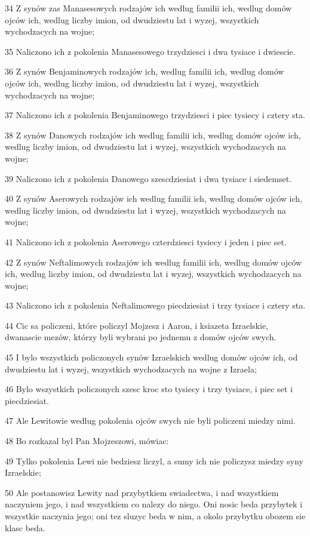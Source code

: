 \par 34 Z synów zas Manasesowych rodzajów ich wedlug familii ich, wedlug domów ojców ich, wedlug liczby imion, od dwudziestu lat i wyzej, wszystkich wychodzacych na wojne;
\par 35 Naliczono ich z pokolenia Manasesowego trzydziesci i dwa tysiace i dwiescie.
\par 36 Z synów Benjaminowych rodzajów ich, wedlug familii ich, wedlug domów ojców ich, wedlug liczby imion, od dwudziestu lat i wyzej, wszystkich wychodzacych na wojne;
\par 37 Naliczono ich z pokolenia Benjaminowego trzydziesci i piec tysiecy i cztery sta.
\par 38 Z synów Danowych rodzajów ich wedlug familii ich, wedlug domów ojców ich, wedlug liczby imion, od dwudziestu lat i wyzej, wszystkich wychodzacych na wojne;
\par 39 Naliczono ich z pokolenia Danowego szescdziesiat i dwa tysiace i siedemset.
\par 40 Z synów Aserowych rodzajów ich wedlug familii ich, wedlug domów ojców ich, wedlug liczby imion, od dwudziestu lat i wyzej, wszystkich wychodzacych na wojne;
\par 41 Naliczono ich z pokolenia Aserowego czterdziesci tysiecy i jeden i piec set.
\par 42 Z synów Neftalimowych rodzajów ich wedlug familii ich, wedlug domów ojców ich, wedlug liczby imion, od dwudziestu lat i wyzej, wszystkich wychodzacych na wojne;
\par 43 Naliczono ich z pokolenia Neftalimowego piecdziesiat i trzy tysiace i cztery sta.
\par 44 Cic sa policzeni, które policzyl Mojzesz i Aaron, i ksiazeta Izraelskie, dwanascie mezów, którzy byli wybrani po jednemu z domów ojców swych.
\par 45 I bylo wszystkich policzonych synów Izraelskich wedlug domów ojców ich, od dwudziestu lat i wyzej, wszystkich wychodzacych na wojne z Izraela;
\par 46 Bylo wszystkich policzonych szesc kroc sto tysiecy i trzy tysiace, i piec set i piecdziesiat.
\par 47 Ale Lewitowie wedlug pokolenia ojców swych nie byli policzeni miedzy nimi.
\par 48 Bo rozkazal byl Pan Mojzeszowi, mówiac:
\par 49 Tylko pokolenia Lewi nie bedziesz liczyl, a sumy ich nie policzysz miedzy syny Izraelskie;
\par 50 Ale postanowisz Lewity nad przybytkiem swiadectwa, i nad wszystkiem naczyniem jego, i nad wszystkiem co nalezy do niego. Oni nosic beda przybytek i wszystkie naczynia jego; oni tez sluzyc beda w nim, a okolo przybytku obozem sie klasc beda.
